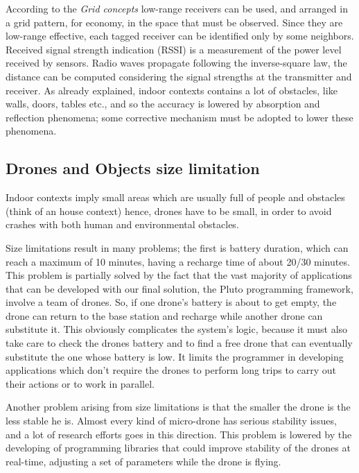 According to the \textit{Grid concepts} low-range receivers can be used, and arranged in a grid pattern, for economy, in the space that must be observed.
Since they are low-range effective, each tagged receiver can be identified only by some neighbors.
Received signal strength indication (RSSI) is a measurement of the power level received by sensors.
Radio waves propagate following the inverse-square law, the distance can be computed considering the signal strengths at the transmitter and receiver.
As already explained, indoor contexts contains a lot of obstacles, like walls, doors, tables etc., and so the accuracy is lowered by absorption and reflection phenomena; some corrective mechanism must be adopted to lower these phenomena.

\newpage

\subsection{Drones and Objects size limitation}


Indoor contexts imply small areas which are usually full of people and obstacles (think of an house context) hence, drones have to be small, in order to avoid crashes with both human and environmental obstacles.

Size limitations result in many problems; the first is battery duration, which can reach a maximum of 10 minutes, having a recharge time of about 20/30 minutes.
This problem is partially solved by the fact that the vast majority of applications that can be developed with our final solution, the Pluto programming framework, involve a team of drones. 
So, if one drone's battery is about to get empty, the drone can return to the base station and recharge while another drone can substitute it.
This obviously complicates the system's logic, because it must also take care to check the drones battery and to find a free drone that can eventually substitute the one whose battery is low.
It limits the programmer in developing applications which don't require the drones to perform long trips to carry out their actions or to work in parallel.

Another problem arising from size limitations is that the smaller the drone is the less stable he is.
Almost every kind of micro-drone has serious stability issues, and a lot of research efforts goes in this direction. This problem is lowered by the developing of programming libraries that could improve stability of the drones at real-time, adjusting a set of parameters while the drone is flying.

